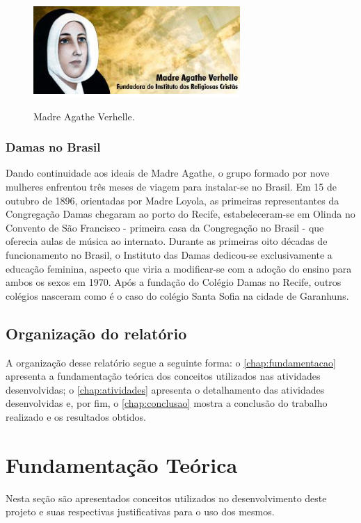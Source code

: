 \documentclass[eso]{bcc}
\begin{document}
\newpage

\begin{figure}[!h]
\centering
\caption[Madre Agathe]{Madre Agathe Verhelle.}
\includegraphics[scale=1.3]{Figuras/madre.png}
\label{UCmadre}
\end{figure}
\subsection{Damas no Brasil}
Dando continuidade aos ideais de Madre Agathe, o grupo formado por nove mulheres enfrentou três meses de viagem para instalar-se no Brasil. Em 15 de outubro de 1896, orientadas por Madre Loyola, as primeiras representantes da Congregação Damas chegaram ao porto do Recife, estabeleceram-se em Olinda no Convento de São Francisco - primeira casa da Congregação no Brasil - que oferecia aulas de música ao internato. Durante as primeiras oito décadas de funcionamento no Brasil, o Instituto das Damas dedicou-se exclusivamente a educação feminina, aspecto que viria a modificar-se com a adoção do ensino para ambos os sexos em 1970. Após a fundação do Colégio Damas no Recife, outros colégios nasceram como é o caso do colégio Santa Sofia na cidade de Garanhuns.

\section{Organização do relatório}

A organização desse relatório segue a seguinte forma: o \autoref{chap:fundamentacao} apresenta a fundamentação teórica dos conceitos utilizados nas atividades desenvolvidas; o \autoref{chap:atividades} apresenta o detalhamento das atividades desenvolvidas  e, por fim, o \autoref{chap:conclusao} mostra a conclusão do trabalho realizado e os resultados obtidos.

\chapter{Fundamentação Teórica}
\label{chap:fundamentacao}

Nesta seção são apresentados conceitos utilizados no desenvolvimento deste projeto e suas respectivas justificativas para o uso dos mesmos.
\end{document}
